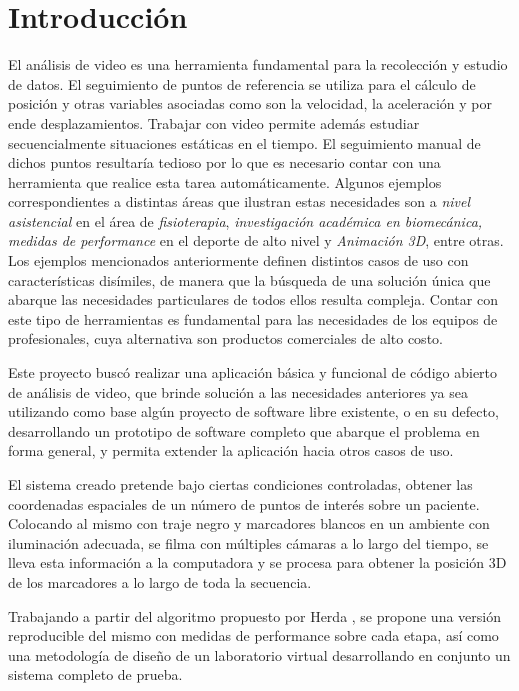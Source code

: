 \section{Introducción}
El análisis de video  es  una  herramienta  fundamental para la recolección y estudio de datos. El seguimiento de puntos de referencia se utiliza para el cálculo de posición y otras variables asociadas como son la velocidad, la aceleración y por ende desplazamientos. Trabajar con video permite además estudiar secuencialmente situaciones estáticas en el tiempo. El seguimiento manual de dichos puntos resultaría tedioso por lo que es necesario contar con una herramienta que realice esta tarea automáticamente.
Algunos ejemplos correspondientes a distintas áreas que ilustran estas necesidades son a \emph{nivel asistencial} en el área de \emph{fisioterapia}, \emph{investigación académica en biomecánica,} \emph{medidas de performance} en el deporte de alto nivel y \emph{Animación 3D}, entre otras. 
Los ejemplos mencionados anteriormente definen distintos casos de uso con características disímiles, de manera que la búsqueda de una solución única que abarque las necesidades particulares de todos ellos resulta compleja. Contar con este tipo de herramientas es fundamental para las necesidades de los equipos de profesionales, cuya alternativa son productos comerciales de alto costo.

Este proyecto buscó realizar una aplicación básica y funcional de código abierto de análisis de video, que brinde solución a las necesidades anteriores ya sea utilizando como base algún  proyecto  de  software  libre  existente, o en su defecto, desarrollando un prototipo de software completo que abarque el problema en forma general, y permita extender la aplicación hacia otros casos de uso.

El sistema creado pretende bajo ciertas condiciones controladas, obtener las coordenadas espaciales de un número de puntos de interés sobre un paciente. 
Colocando al mismo con traje negro y marcadores blancos en un ambiente con iluminación adecuada, se filma con múltiples cámaras a lo largo del tiempo, se lleva esta información a la computadora y se procesa para obtener la posición 3D de los marcadores a lo largo de toda la secuencia. 

Trabajando a partir del algoritmo propuesto por Herda \cite{herda}, se propone una versión reproducible del mismo con medidas de performance sobre cada etapa, así como una metodología de diseño de un laboratorio virtual desarrollando en conjunto  un sistema completo de prueba.
